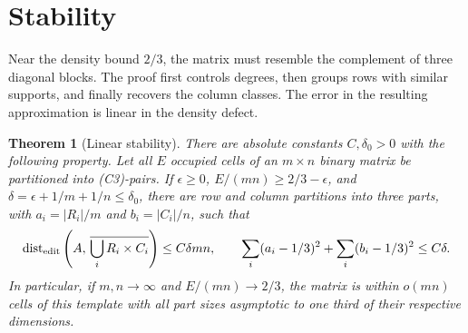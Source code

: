 \documentclass[11pt]{article}
\newtheorem{theorem}{Theorem}
\begin{document}
\section{Stability}
Near the density bound $2/3$, the matrix must resemble the complement of
three diagonal blocks. The proof first controls degrees, then groups rows
with similar supports, and finally recovers the column classes.
The error in the resulting approximation is linear in the density defect.

\begin{theorem}[Linear stability]\label{thm:phasestability}
There are absolute constants $C,\delta_0>0$ with the following property.
Let all $E$ occupied cells of an $m\times n$ binary matrix be partitioned
into (C3)-pairs. If $\epsilon\ge0$, $E/(mn)\ge2/3-\epsilon$, and
$\delta=\epsilon+1/m+1/n\le\delta_0$, there are row and column partitions
into three parts, with $a_i=|R_i|/m$ and $b_i=|C_i|/n$, such that
\[
 \operatorname{dist}_{\rm edit}
 \left(A,\,\overline{\bigcup_i R_i\times C_i}\right)\le C\delta mn,
 \qquad
 \sum_i(a_i-1/3)^2+\sum_i(b_i-1/3)^2\le C\delta.
\]
In particular, if $m,n\to\infty$ and $E/(mn)\to2/3$, the matrix is
within $o(mn)$ cells of this template with all part sizes asymptotic
to one third of their respective dimensions.
\end{theorem}
\end{document}
